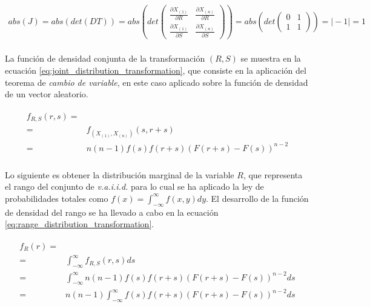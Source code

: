 \documentclass{article}
\begin{document}
    \begin{align}
    \label{eq:variable_transformation_jacobian}
      abs(J) =
      abs(det(DT)) =
      abs\left(det\left( \begin{array}{cc}
        \frac{\partial X_{(1)}}{ \partial R} & \frac{\partial X_{(n)}}{ \partial R}  \\
        \frac{\partial X_{(1)}}{ \partial S} & \frac{\partial X_{(n)}}{ \partial S}
      \end{array} \right) \right) =
      abs\left(det\left( \begin{array}{cc}
        0 & 1  \\
        1 & 1
      \end{array} \right) \right)  =
      \mid -1\mid =
      1
    \end{align}

    \paragraph{}
    La función de densidad conjunta de la transformación $(R,S)$ se muestra en la ecuación \eqref{eq:joint_distribution_transformation}, que consiste en la aplicación del teorema de \emph{cambio de variable}, en este caso aplicado sobre la función de densidad de un vector aleatorio.

    \begin{align}
    \label{eq:joint_distribution_transformation}
      \begin{split}
        f_{R,S}(r,s) =& \\
        =& f_{(X_{(1)}, X_{(n)})} (s,r+s) \\
        =& n(n-1)f(s)f(r+s)(F(r+s) - F(s))^{n-2}
      \end{split}
    \end{align}

    \paragraph{}
    Lo siguiente es obtener la distribución marginal de la variable $R$, que representa el rango del conjunto de \emph{v.a.i.i.d.} para lo cual se ha aplicado la ley de probabilidades totales como $f(x) = \int_{-\infty}^{\infty} f(x,y) dy$. El desarrollo de la función de densidad del rango se ha llevado a cabo en la ecuación \eqref{eq:range_distribution_transformation}.

    \begin{align}
    \label{eq:range_distribution_transformation}
      \begin{split}
        f_{R} (r) =& \\
        =& \int_{-\infty}^{\infty} f_{R,S}(r,s) ds \\
        =& \int_{-\infty}^{\infty} n(n-1)f(s)f(r+s)(F(r+s) - F(s))^{n-2} ds \\
        =& n(n-1)\int_{-\infty}^{\infty} f(s)f(r+s)(F(r+s) - F(s))^{n-2} ds \\
      \end{split}
    \end{align}
\end{document}
